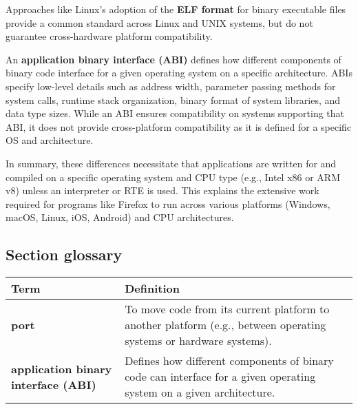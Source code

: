 Approaches like Linux's adoption of the \textbf{ELF format} for binary executable files provide a common standard across Linux and UNIX systems, but do not guarantee cross-hardware platform compatibility.

An \textbf{application binary interface (ABI)} defines how different components of binary code interface for a given operating system on a specific architecture. ABIs specify low-level details such as address width, parameter passing methods for system calls, runtime stack organization, binary format of system libraries, and data type sizes. While an ABI ensures compatibility on systems supporting that ABI, it does not provide cross-platform compatibility as it is defined for a specific OS and architecture.

In summary, these differences necessitate that applications are written for and compiled on a specific operating system and CPU type (e.g., Intel x86 or ARM v8) unless an interpreter or RTE is used. This explains the extensive work required for programs like Firefox to run across various platforms (Windows, macOS, Linux, iOS, Android) and CPU architectures.

\subsection*{Section glossary}

\begin{tabular}{>{\raggedright}p{} >{\raggedright\arraybackslash}p{}}
\toprule
\textbf{Term} & \textbf{Definition} \\
\midrule
\textbf{port} & To move code from its current platform to another platform (e.g., between operating systems or hardware systems). \\
\textbf{application binary interface (ABI)} & Defines how different components of binary code can interface for a given operating system on a given architecture. \\
\bottomrule
\end{tabular}
\vspace{\baselineskip}
